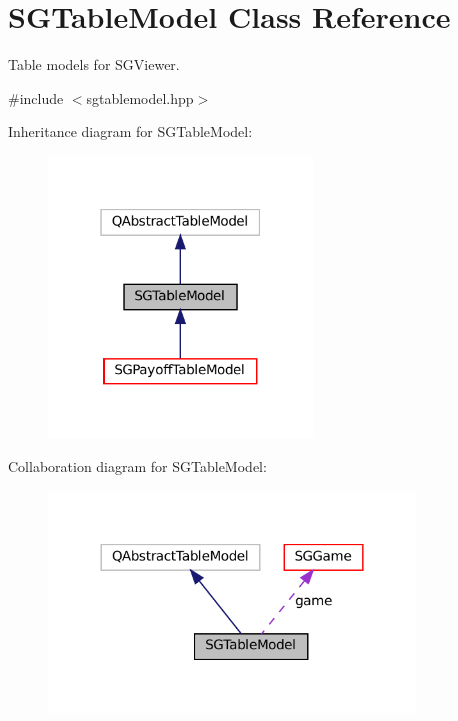 \hypertarget{classSGTableModel}{}\section{S\+G\+Table\+Model Class Reference}
\label{classSGTableModel}


Table models for S\+G\+Viewer.  




{\ttfamily \#include $<$sgtablemodel.\+hpp$>$}



Inheritance diagram for S\+G\+Table\+Model\+:
\nopagebreak
\begin{figure}[H]
\begin{center}
\leavevmode
\includegraphics[width=199pt]{classSGTableModel__inherit__graph}
\end{center}
\end{figure}


Collaboration diagram for S\+G\+Table\+Model\+:
\nopagebreak
\begin{figure}[H]
\begin{center}
\leavevmode
\includegraphics[width=276pt]{classSGTableModel__coll__graph}
\end{center}
\end{figure}
